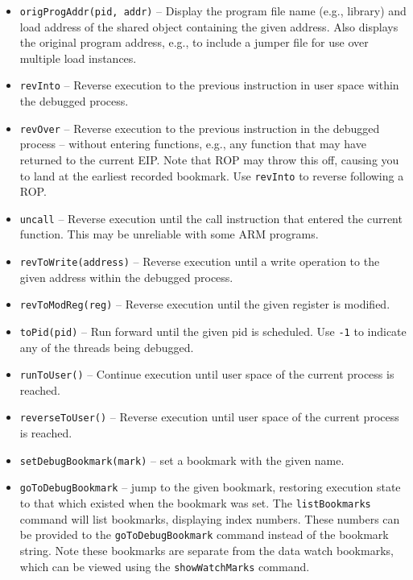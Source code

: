 \documentclass[titlepage]{article}
\begin{document}
\begin{itemize}
\item {\tt origProgAddr(pid, addr)} – Display the program file name (e.g., library) and load address of the shared object containing the given address.  Also displays the 
original program address, e.g., to include a jumper file for use over multiple load instances.

\item {\tt revInto} – Reverse execution to the previous instruction in user space within the debugged process. 

\item {\tt revOver} – Reverse execution to the previous instruction in the debugged process – without entering functions, e.g., any function that may have returned to the current EIP.  Note that ROP may throw this off, causing you to land at the earliest recorded bookmark.  Use {\tt revInto} to reverse following a ROP.

\item {\tt uncall} – Reverse execution until the call instruction that entered the current function.  This may be unreliable with some ARM
programs.

\item {\tt revToWrite(address)} – Reverse execution until a write operation to the given address within the debugged process.

\item {\tt revToModReg(reg)} – Reverse execution until the given register is modified.


\item {\tt toPid(pid)} -- Run forward until the given pid is scheduled.  Use {\tt -1} to indicate any of the threads being debugged.

\item {\tt runToUser()} – Continue execution until user space of the current process is reached.

\item {\tt reverseToUser()} – Reverse execution until user space of the current process is reached.

\item {\tt setDebugBookmark(mark)} – set a bookmark with the given name.

\item {\tt goToDebugBookmark} – jump to the given bookmark, restoring execution state to that which existed when the bookmark was set.  The
{\tt listBookmarks} command will list bookmarks, displaying  index numbers.  These numbers can be provided to the {\tt goToDebugBookmark} command instead
of the bookmark string.  Note these bookmarks are separate from the data watch bookmarks, which can be viewed using the {\tt showWatchMarks} command.


\end{itemize}
\end{document}

